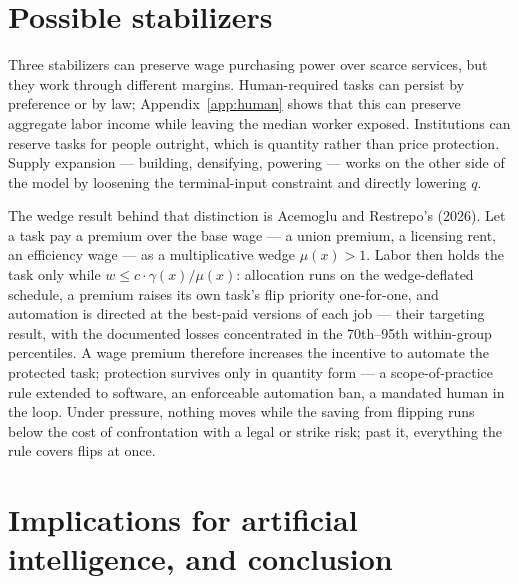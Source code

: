 \documentclass[12pt]{article}
\theoremstyle{plain}
\begin{document}
\section{Possible stabilizers}\label{sec:stabilizers}

Three stabilizers can preserve wage purchasing power over scarce services, but they work through different margins. Human-required tasks can persist by preference or by law; Appendix~\ref{app:human} shows that this can preserve aggregate labor income while leaving the median worker exposed. Institutions can reserve tasks for people outright, which is quantity rather than price protection. Supply expansion --- building, densifying, powering --- works on the other side of the model by loosening the terminal-input constraint and directly lowering $q$.

The wedge result behind that distinction is Acemoglu and Restrepo's (2026). Let a task pay a premium over the base wage --- a union premium, a licensing rent, an efficiency wage --- as a multiplicative wedge $\mu (x) > 1$. Labor then holds the task only while $w \le c\cdot \gamma (x)/\mu (x)$: allocation runs on the wedge-deflated schedule, a premium raises its own task's flip priority one-for-one, and automation is directed at the best-paid versions of each job --- their targeting result, with the documented losses concentrated in the 70th--95th within-group percentiles. A wage premium therefore increases the incentive to automate the protected task; protection survives only in quantity form --- a scope-of-practice rule extended to software, an enforceable automation ban, a mandated human in the loop. Under pressure, nothing moves while the saving from flipping runs below the cost of confrontation with a legal or strike risk; past it, everything the rule covers flips at once.

\section{Implications for artificial intelligence, and conclusion}\label{sec:ai}
\end{document}
